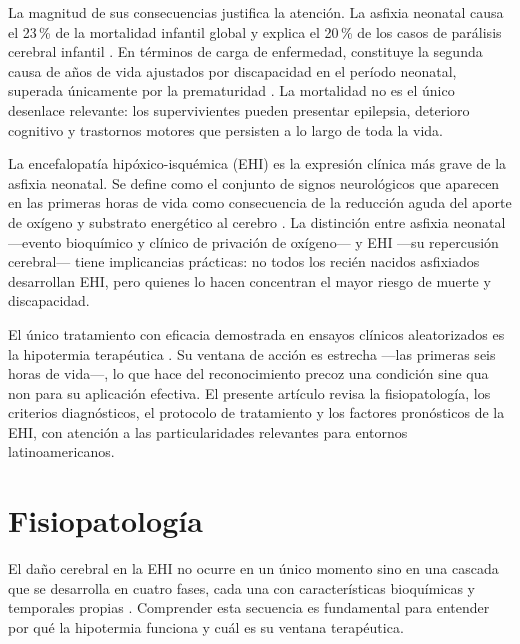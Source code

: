 \documentclass[12pt]{article}
\begin{document}
La magnitud de sus consecuencias justifica la atención. La asfixia neonatal causa el
23\,\% de la mortalidad infantil global y explica el 20\,\% de los casos de parálisis
cerebral infantil \parencite{lawn2005}. En términos de carga de enfermedad, constituye
la segunda causa de años de vida ajustados por discapacidad en el período neonatal,
superada únicamente por la prematuridad \parencite{kurinczuk2010}. La mortalidad no es
el único desenlace relevante: los supervivientes pueden presentar epilepsia, deterioro
cognitivo y trastornos motores que persisten a lo largo de toda la vida.

La encefalopatía hipóxico-isquémica (EHI) es la expresión clínica más grave de la
asfixia neonatal. Se define como el conjunto de signos neurológicos que aparecen en las
primeras horas de vida como consecuencia de la reducción aguda del aporte de oxígeno
y substrato energético al cerebro \parencite{volpe2012}. La distinción entre asfixia
neonatal ---evento bioquímico y clínico de privación de oxígeno--- y EHI ---su repercusión
cerebral--- tiene implicancias prácticas: no todos los recién nacidos asfixiados
desarrollan EHI, pero quienes lo hacen concentran el mayor riesgo de muerte y
discapacidad.

El único tratamiento con eficacia demostrada en ensayos clínicos aleatorizados es la
hipotermia terapéutica \parencite{shankaran2005, gluckman2005, azzopardi2008}. Su
ventana de acción es estrecha ---las primeras seis horas de vida---, lo que hace del
reconocimiento precoz una condición sine qua non para su aplicación efectiva. El
presente artículo revisa la fisiopatología, los criterios diagnósticos, el protocolo de
tratamiento y los factores pronósticos de la EHI, con atención a las particularidades
relevantes para entornos latinoamericanos.

\section{Fisiopatología}
\label{sec:fisiopatologia}

El daño cerebral en la EHI no ocurre en un único momento sino en una cascada que se
desarrolla en cuatro fases, cada una con características bioquímicas y temporales
propias \parencite{ferriero2004}. Comprender esta secuencia es fundamental para
entender por qué la hipotermia funciona y cuál es su ventana terapéutica.
\end{document}
